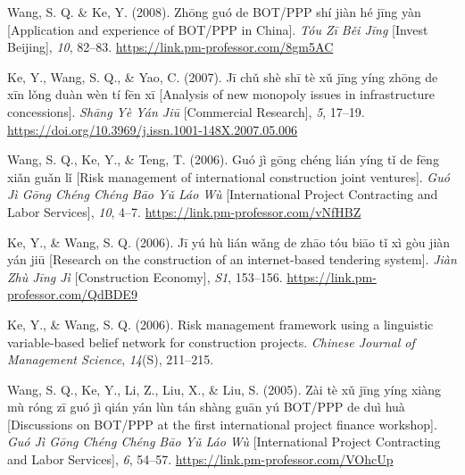 \documentclass[11pt,a4paper]{report} %
\begin{document}
\begin{tablist}
        \item[2008] \tab{}Wang, S. Q. \& Ke, Y. (2008). Zhōng guó de BOT/PPP shí jiàn hé jīng yàn [Application and experience of BOT/PPP in China]. \textit{Tóu Zī Běi Jīng} [Invest Beijing], \textit{10}, 82--83. \href{https://link.pm-professor.com/8gm5AC}{https://link.pm-professor.com/8gm5AC}        
        
        \item[2007] \tab{}Ke, Y., Wang, S. Q., \& Yao, C. (2007). Jī chǔ shè shī tè xǔ jīng yíng zhōng de xīn lǒng duàn wèn tí fēn xī [Analysis of new monopoly issues in infrastructure concessions]. \textit{Shāng Yè Yán Jiū} [Commercial Research], \textit{5}, 17--19. \href{https://doi.org/10.3969/j.issn.1001-148X.2007.05.006}{https://doi.org/10.3969/j.issn.1001-148X.2007.05.006}
        
        \item[2006] \tab{}Wang, S. Q., Ke, Y., \& Teng, T. (2006). Guó jì gōng chéng lián yíng tǐ de fēng xiǎn guǎn lǐ [Risk management of international construction joint ventures]. \textit{Guó Jì Gōng Chéng Chéng Bāo Yǔ Láo Wù} [International Project Contracting and Labor Services], \textit{10}, 4--7. \href{https://link.pm-professor.com/vNfHBZ}{https://link.pm-professor.com/vNfHBZ}
        
        \item[2006] \tab{}Ke, Y., \& Wang, S. Q. (2006). Jī yú hù lián wǎng de zhāo tóu biāo tǐ xì gòu jiàn yán jiū [Research on the construction of an internet-based tendering system]. \textit{Jiàn Zhù Jīng Jì} [Construction Economy], \textit{S1}, 153--156. \href{https://link.pm-professor.com/QdBDE9}{https://link.pm-professor.com/QdBDE9}
        
        \item[2006] \tab{}Ke, Y., \& Wang, S. Q. (2006). Risk management framework using a linguistic variable-based belief network for construction projects. \textit{Chinese Journal of Management Science}, \textit{14}(S), 211--215.
        
        \item[2005] \tab{}Wang, S. Q., Ke, Y., Li, Z., Liu, X., \& Liu, S. (2005). Zài tè xǔ jīng yíng xiàng mù róng zī guó jì qián yán lùn tán shàng guān yú BOT/PPP de duì huà [Discussions on BOT/PPP at the first international project finance workshop]. \textit{Guó Jì Gōng Chéng Chéng Bāo Yǔ Láo Wù} [International Project Contracting and Labor Services], \textit{6}, 54--57. \href{https://link.pm-professor.com/VOhcUp}{https://link.pm-professor.com/VOhcUp}

    \end{tablist}
\end{document}
